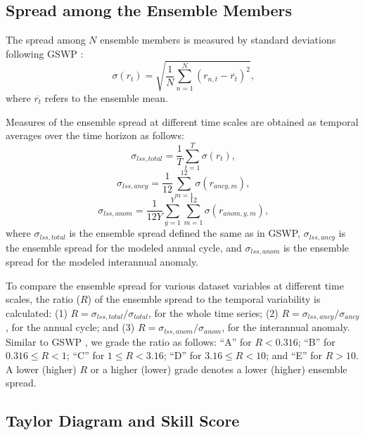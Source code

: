 \documentclass[essd, manuscript]{copernicus}
\begin{document}
\subsection{Spread among the Ensemble Members}\label{sec:methods:spread}

The spread among \(N\) ensemble members is measured by standard deviations following GSWP \citep{dirmeyer2006BAMS}:
\begin{equation}
  \sigma(r_{t}) = \sqrt{\frac{1}{N}\sum_{n=1}^{N}(r_{n,t} - \overline{r_{t}})^{2}}
  \text{,}
\end{equation}
where \(\overline{r_{t}}\) refers to the ensemble mean.

Measures of the ensemble spread at different time scales are obtained as temporal averages over the time horizon as follows:
\begin{equation}
  \sigma_{lss,total} = \frac{1}{T} \sum_{t=1}^{T} \sigma(r_{t})
  \text{,}
\end{equation}
\begin{equation}
  \sigma_{lss,ancy} = \frac{1}{12} \sum_{m=1}^{12} \sigma(r_{ancy,m})
  \text{,}
\end{equation}
\begin{equation}
  \sigma_{lss,anom} = \frac{1}{12Y} \sum_{y=1}^{Y} \sum_{m=1}^{12} \sigma(r_{anom,y,m})
  \text{,}
\end{equation}
where \(\sigma_{lss,total}\) is the ensemble spread defined the same as in GSWP, \(\sigma_{lss,ancy}\) is the ensemble spread for the modeled annual cycle, and \(\sigma_{lss,anom}\) is the ensemble spread for the modeled interannual anomaly.

To compare the ensemble spread for various dataset variables at different time scales, the ratio (\(R\)) of the ensemble spread to the temporal variability is calculated: (1) \(R=\sigma_{lss,total}/\sigma_{total}\), for the whole time series; (2) \(R=\sigma_{lss,ancy}/\sigma_{ancy}\), for the annual cycle; and (3) \(R=\sigma_{lss,anom}/\sigma_{anom}\), for the interannual anomaly. Similar to GSWP \citep{dirmeyer2006BAMS}, we grade the ratio as follows: ``A'' for \(R < 0.316\); ``B'' for \(0.316 \le R < 1\); ``C'' for \(1 \le R < 3.16\); ``D'' for \(3.16 \le R < 10\); and ``E'' for \(R > 10\). A lower (higher) \(R\) or a higher (lower) grade denotes a lower (higher) ensemble spread.

\subsection{Taylor Diagram and Skill Score}\label{sec:methods:taylor}
\end{document}
